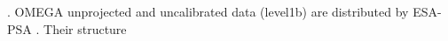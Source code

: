 .
OMEGA unprojected and uncalibrated data (level1b) are distributed by ESA-PSA \citep{BESSE2018131}.
Their structure